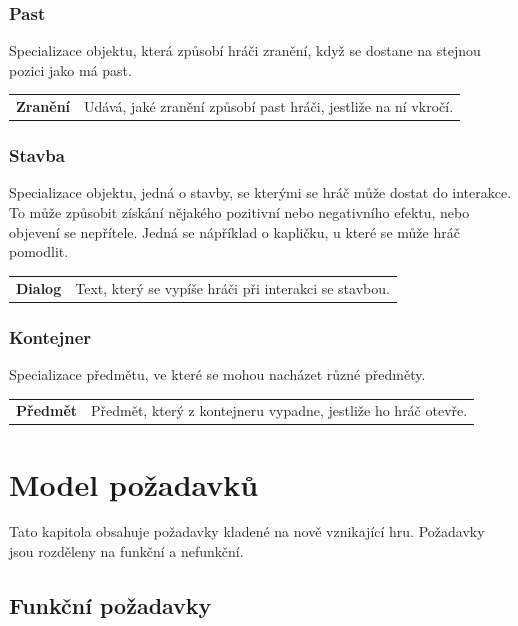 \documentclass[12pt,a4paper]{article}
\begin{document}
\subsubsection{Past}
Specializace objektu, která způsobí hráči zranění, když se dostane na stejnou
pozici jako má past.\\[5pt]

\begin{tabular*}{0.87\textwidth}{ll}
  \bf Zranění & Udává, jaké zranění způsobí past hráči, jestliže na ní
  vkročí.\\[7pt]
\end{tabular*}

\subsubsection{Stavba}
Specializace objektu, jedná o stavby, se kterými se hráč může dostat do
interakce. To může způsobit získání nějakého pozitivní nebo negativního efektu,
nebo objevení se nepřítele. Jedná se nápříklad o kapličku, u které se může hráč
pomodlit.\\[5pt]

\begin{tabular*}{0.87\textwidth}{ll}
  \bf Dialog & Text, který se vypíše hráči při interakci se stavbou.\\[7pt]
\end{tabular*}

\subsubsection{Kontejner}
Specializace předmětu, ve které se mohou nacházet různé předměty.\\[5pt]

\begin{tabular*}{0.87\textwidth}{ll}
  \bf Předmět & Předmět, který z kontejneru vypadne, jestliže ho hráč
  otevře.\\[7pt]
\end{tabular*}

\section{Model požadavků}
Tato kapitola obsahuje požadavky kladené na nově vznikající hru. Požadavky jsou
rozděleny na funkční a nefunkční.

\subsection{Funkční požadavky}
\end{document}
